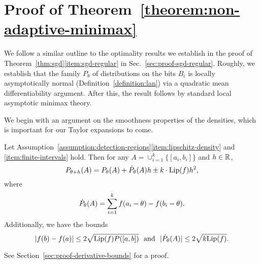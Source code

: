 
\section{Proof of Theorem~\ref{theorem:non-adaptive-minimax}}

We follow a similar outline to the optimality results we establish
in the proof of Theorem~\ref{thm:sgd}\eqref{item:sgd-regular} in
Sec.~\ref{sec:proof-sgd-regular}.
Roughly, we establish that the family $P_\theta$ of distributions
on the bits $B_i$ is locally asymptotically normal
(Definition~\ref{definition:lan}) via a quadratic
mean differentiability argument. After this, the result
follows by standard local asymptotic minimax theory.

We begin with an argument on the smoothness properties of the densities,
which is important for our Taylor expansions to come.
\begin{lemma}
  \label{lemma:derivative-bounds}
  Let
  Assumption~\ref{assumption:detection-regions}\eqref{item:lipschitz-density}
  and \eqref{item:finite-intervals} hold. Then for any $A = \cup_{i = 1}^k
  \{[a_i, b_i]\}$ and $h \in \mathbb{R}$,
  \begin{equation*}
    P_{\theta + h}(A) = P_\theta(A) + \dot{P}_\theta(A) h \pm
    k \cdot {\rm \textup{Lip}}(f) h^2,
  \end{equation*}
  where
  \begin{equation}
    \dot{P}_\theta(A) = \sum_{i = 1}^k f(a_i - \theta) - f(b_i - \theta).
    \label{eqn:expansion-dPtheta}
  \end{equation}
  Additionally, we have the bounds
  \begin{equation}
    \label{eqn:bound-density-diffs}
    |f(b) - f(a)| \le 2 \sqrt{{\rm \textup{Lip}}(f) P([a, b])}
    ~~ \mbox{and} ~~
    |\dot{P}_\theta(A)| \le 2 \sqrt{k {\rm \textup{Lip}}(f)}.
  \end{equation}
\end{lemma}
\noindent
See Section~\ref{sec:proof-derivative-bounds} for a proof.

